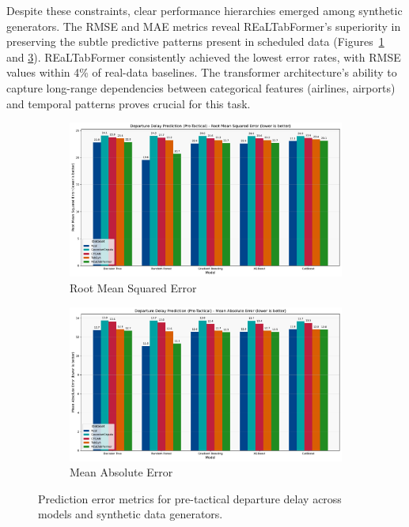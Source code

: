 \documentclass[conference]{IEEEtran}
\begin{document}
Despite these constraints, clear performance hierarchies emerged among synthetic generators. The RMSE and MAE metrics reveal REaLTabFormer's superiority in preserving the subtle predictive patterns present in scheduled data (Figures~\ref{fig:departure_pre_rmse} and \ref{fig:departure_pre_mae}). REaLTabFormer consistently achieved the lowest error rates, with RMSE values within 4\% of real-data baselines. The transformer architecture's ability to capture long-range dependencies between categorical features (airlines, airports) and temporal patterns proves crucial for this task.

\begin{figure}[htbp]
    \centering
    \begin{subfigure}[b]{0.49\textwidth}
        \includegraphics[width=\linewidth]{plots/departure_delay_min_pre-tactical/departure_delay_min_pre-tactical_rmse.pdf}
        \caption{Root Mean Squared Error}
        \label{fig:departure_pre_rmse}
    \end{subfigure}
    \hfill
    \begin{subfigure}[b]{0.49\textwidth}
        \includegraphics[width=\linewidth]{plots/departure_delay_min_pre-tactical/departure_delay_min_pre-tactical_mae.pdf}
        \caption{Mean Absolute Error}
        \label{fig:departure_pre_mae}
    \end{subfigure}
    \caption{Prediction error metrics for pre-tactical departure delay across models and synthetic data generators.}
\end{figure}
\end{document}
